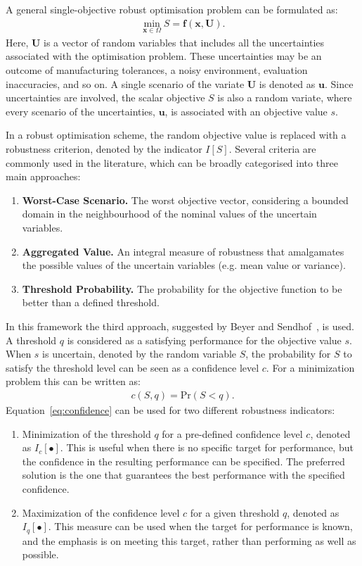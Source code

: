 \documentclass[10pt]{llncs}
\newcommand{\brr}[1]{{\left({#1}\right)}} %
\newcommand{\I}[1]{I\!\left[{#1}\right]} %
\newcommand{\Iq}[1]{I_q\!\left[{#1}\right]} %
\newcommand{\Ic}[1]{I_c\!\left[{#1}\right]} %
\newcommand{\vx}{\mathbf{x}} %
\newcommand{\vf}{\mathbf{f}} %
\newcommand{\vu}{\mathbf{u}} %
\newcommand{\vU}{\mathbf{U}} %
\begin{document}
A general single-objective robust optimisation problem can be formulated as:
\begin{align}
\label{eq:rev:robust}
\min_{\vx\in\Omega} S=\vf\brr{\vx,\vU}.
\end{align}
Here, $\vU$ is a vector of random variables that includes all the uncertainties associated with the optimisation problem.
These uncertainties may be an outcome of manufacturing tolerances, a noisy environment, evaluation inaccuracies, and so on.
A single scenario of the variate $\vU$ is denoted as $\vu$.
Since uncertainties are involved, the scalar objective $S$ is also a random variate, where every scenario of the uncertainties, $\vu$, is associated with an objective value $s$.

In a robust optimisation scheme, the random objective value is replaced with a robustness criterion, denoted by the indicator $\I{S}$.
Several criteria are commonly used in the literature, which can be broadly categorised into three main approaches:
\begin{enumerate}
%
\item \textbf{Worst-Case Scenario.} The worst objective vector, considering a bounded domain in the neighbourhood of the nominal values of the uncertain variables.
%
\item \textbf{Aggregated Value.} An integral measure of robustness that amalgamates the possible values of the uncertain variables (e.g. mean value or variance).
%
\item \textbf{Threshold Probability.} The probability for the objective function to be better than a defined threshold.
\end{enumerate}

In this framework the third approach, suggested by Beyer and Sendhof~\cite{Beyer2007}, is used.
A threshold $q$ is considered as a satisfying performance for the objective value $s$.
When $s$ is uncertain, denoted by the random variable $S$, the probability for $S$ to satisfy the threshold level can be seen as a confidence level $c$.
For a minimization problem this can be written as:
\begin{align}
\label{eq:confidence}
	c\brr{S,q}=\text{Pr}\brr{S<q}.
\end{align}
Equation~\eqref{eq:confidence} can be used for two different robustness indicators:
\begin{enumerate}
	\item Minimization of the threshold $q$ for a pre-defined confidence level $c$, denoted as $\Ic{\bullet}$.
		This is useful when there is no specific target for performance, but the confidence in the resulting performance can be specified.
		The preferred solution is the one that guarantees the best performance with the specified confidence.
	\item Maximization of the confidence level $c$ for a given threshold $q$, denoted as $\Iq{\bullet}$.
		This measure can be used when the target for performance is known, and the emphasis is on meeting this target, rather than performing as well as possible.
\end{enumerate}
\end{document}
